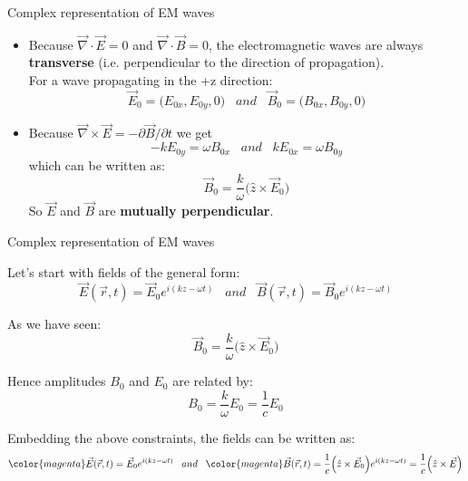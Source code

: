 \begin{frame}{Complex representation of EM waves}

\begin{itemize}
\item
  Because $\displaystyle \vec{\nabla} \cdot \vec{E} = 0$ and
  $\displaystyle \vec{\nabla} \cdot \vec{B} = 0$,
  the electromagnetic waves are always {\bf transverse}
  (i.e. perpendicular to the direction of propagation).\\
  \vspace{0.2cm}
  For a wave propagating in the +z direction:
  \begin{equation*}
    \vec{E}_0 = \Big( E_{0x}, E_{0y}, 0 \Big)   \;\;\; and \;\;\;
    \vec{B}_0 = \Big( B_{0x}, B_{0y}, 0 \Big)
  \end{equation*}

\item
  Because $\displaystyle \vec{\nabla} \times \vec{E} = - \partial \vec{B} / \partial t$
  we get
  \begin{equation*}
     -k E_{0y} = \omega B_{0x} \;\;\; and \;\;\;
      k E_{0x} = \omega B_{0y}
  \end{equation*}
  which can be written as:
  \begin{equation*}
       \vec{B}_{0} = \frac{k}{\omega} \Big( \hat{z} \times \vec{E}_0 \Big)
  \end{equation*}
  So $\vec{E}$ and $\vec{B}$ are {\bf mutually perpendicular}.

\end{itemize}

\end{frame}

%
%
%

\begin{frame}{Complex representation of EM waves}

Let's start with fields of the general form:
\begin{equation*}
    \vec{E}(\vec{r},t) = \vec{E}_0  e^{i (kz-\omega t)}
    \;\;\; and \;\;\;
    \vec{B}(\vec{r},t) = \vec{B}_0  e^{i (kz-\omega t)}
\end{equation*}

As we have seen:
\begin{equation*}
       \vec{B}_{0} = \frac{k}{\omega} \Big( \hat{z} \times \vec{E}_0 \Big)
\end{equation*}

Hence amplitudes $B_{0}$ and $E_{0}$ are related by:
\begin{equation*}
     B_{0} = \frac{k}{\omega} E_0 = \frac{1}{c} E_0
\end{equation*}

Embedding the above constraints, the fields can be written as:
\begin{equation*}
    {\color{magenta} \vec{E}(\vec{r},t) = \vec{E}_0  e^{i (kz-\omega t)}  }
    \;\;\; and \;\;\;
    {\color{magenta} \vec{B}(\vec{r},t) = \frac{1}{c} \Big( \hat{z}
      \times \vec{E}_0 \Big)  e^{i (kz-\omega t)} = \frac{1}{c} \Big(
      \hat{z} \times \vec{E} \Big) }
\end{equation*}


\end{frame}



